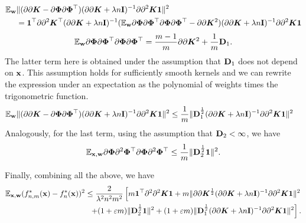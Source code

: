 \begin{align*}
    \mathbb{E}_{\bf w}&\|(\partial\partial {\bm K} - \partial\bm{\Phi}\partial\bm{\Phi}^{\top})(\partial\partial {\bm K} + \lambda n {\bf I})^{-1}\partial\partial^2 {\bm K}{\bf 1}\|^2\\
    & = {\bf 1}^{\top}\partial\partial^2 {\bm K}^{\top}(\partial\partial {\bm K} + \lambda n {\bf I})^{-1}(\mathbb{E}_{\bf w}\partial\bm{\Phi}\partial\bm{\Phi}^{\top}\partial\bm{\Phi}\partial\bm{\Phi}^{\top} - \partial\partial {\bm K}^2)(\partial\partial {\bm K} + \lambda n {\bf I})^{-1}\partial\partial^2 {\bm K}{\bf 1}
\end{align*}
\begin{align*}
    \mathbb{E}_{\bf w}\partial\bm{\Phi}\partial\bm{\Phi}^{\top}\partial\bm{\Phi}\partial\bm{\Phi}^{\top} = \frac{m - 1}{m} \partial\partial {\bm K}^2 + \frac{1}{m}{\bf D}_1.
\end{align*}
The latter term here is obtained under the assumption that ${\bf D}_1$ does not depend on
${\bf x}$.
This assumption holds for sufficiently smooth kernels and we can
rewrite the expression under an expectation as the polynomial of weights times
the trigonometric function.
\begin{align*}
    \mathbb{E}_{\bf w}&\|(\partial\partial {\bm K} - \partial\bm{\Phi}\partial\bm{\Phi}^{\top})(\partial\partial {\bm K} + \lambda n {\bf I})^{-1}\partial\partial^2 {\bm K}{\bf 1}\|^2
    \leq \frac{1}{m}\|{\bf D}_1^{\frac{1}{2}}(\partial\partial {\bm K} + \lambda n {\bf I})^{-1}\partial\partial^2 {\bm K}{\bf 1}\|^2
\end{align*}
Analogously, for the last term, using the assumption that ${\bf D}_2 < \infty$, we have
\begin{align*}
    \mathbb{E}_{{\bf x, w}} \partial\bm{\Phi}\partial^2\bm{\Phi}^{\top}\partial\bm{\Phi}\partial^2\bm{\Phi}^{\top} \leq \frac{1}{m}\|{\bf D}_2^{\frac{1}{2}}{\bf 1}\|^2.
\end{align*}

Finally, combining all the above, we have
\begin{align*}
    \mathbb{E}_{{\bf x}, {\bf w}}(f_{n, m}^*({\bf x}) - f_n^*({\bf x}))^2 \leq \frac{2}{\lambda^2 n^2 m^2}\left[
    m{\bf 1}^{\top}\partial^2\partial^2{\bm K}{\bf 1} + m\|\partial\partial {\bm K}^{\frac{1}{2}}(\partial\partial {\bm K} + \lambda n{\bf I})^{-1}\partial\partial^2 {\bm K}{\bf 1}\|^2 \right. \nonumber \\
    \left. + (1 + \varepsilon m)\|{\bf D}_2^{\frac{1}{2}}{\bf 1}\|^2 + (1 + \varepsilon m)\|{\bf D}_1^{\frac{1}{2}}(\partial\partial {\bm K} + \lambda n {\bf I})^{-1}\partial\partial^2 {\bm K}{\bf 1}\|^2
    \right].
\end{align*}



